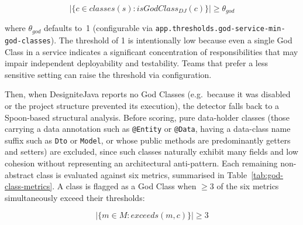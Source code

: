 \begin{equation}
    \bigl|\{c \in \mathit{classes}(s) : \mathit{isGodClass}_{\mathit{DJ}}(c)\}\bigr| \geq \theta_{\mathit{god}}
    \label{eq:god-service-detection}
\end{equation}

\noindent where $\theta_{\mathit{god}}$ defaults to~1 (configurable via \texttt{ap\-p\-.thr\-esh\-ol\-ds.\-god\--ser\-vice-min\--god\--cla\-sses}). The threshold of 1 is intentionally low because even a single God Class in a service indicates a significant concentration of responsibilities that may impair independent deployability and testability. Teams that prefer a less sensitive setting can raise the threshold via configuration.

Then, when DesigniteJava reports no God Classes (e.g.\ because it was disabled or the project structure prevented its execution), the detector falls back to a Spoon-based structural analysis. Before scoring, pure data-holder classes (those carrying a data annotation such as \texttt{@Entity} or \texttt{@Data}, having a data-class name suffix such as \texttt{Dto} or \texttt{Model}, or whose public methods are predominantly getters and setters) are excluded, since such classes naturally exhibit many fields and low cohesion without representing an architectural anti-pattern. Each remaining non-abstract class is evaluated against six metrics, summarised in Table~\ref{tab:god-class-metrics}. A class is flagged as a God Class when $\geq 3$ of the six metrics simultaneously exceed their thresholds:

\begin{equation}
    \bigl|\{m \in M : \mathit{exceeds}(m, c)\}\bigr| \geq 3
    \label{eq:god-class-multi-metric}
\end{equation}

